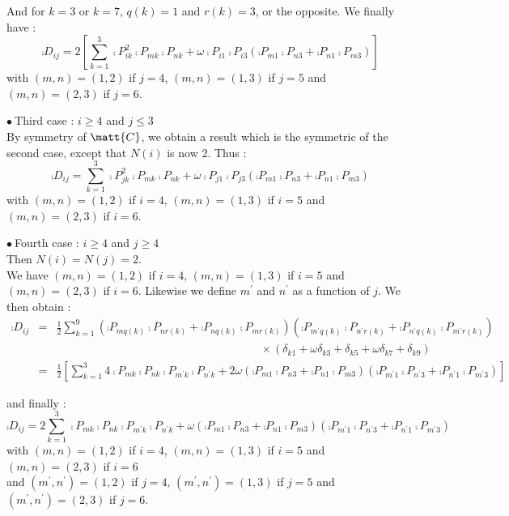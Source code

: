 And for $k=3$ or $k=7$, $q(k)=1$ and $r(k)=3$, or the opposite. We finally have :
\begin{equation}
\comp{D}_{ij}=2\left[\sum_{k=1}^3
\comp{P}_{ik}^2\comp{P}_{mk}\comp{P}_{nk}
+\omega\comp{P}_{i1}\comp{P}_{i3}\left(
\comp{P}_{m1}\comp{P}_{n3}+\comp{P}_{n1}\comp{P}_{m3}\right)
\right]
\end{equation}
with $(m,n)=(1,2)$ if $j=4$, $(m,n)=(1,3)$ if $j=5$ and $(m,n)=(2,3)$ if
$j=6$.

\vspace{1cm}
$\bullet\ ${\sc Third case} : $i\geqslant 4$ and $j\leqslant 3$\\
By symmetry of $\matt{C}$, we obtain a result which is the symmetric of
the second case, except that $N(i)$ is now 2. Thus :
\begin{equation}
\comp{D}_{ij}=\sum_{k=1}^3
\comp{P}_{jk}^2\comp{P}_{mk}\comp{P}_{nk}
+\omega\comp{P}_{j1}\comp{P}_{j3}\left(
\comp{P}_{m1}\comp{P}_{n3}+\comp{P}_{n1}\comp{P}_{m3}\right)
\end{equation}
with $(m,n)=(1,2)$ if $i=4$, $(m,n)=(1,3)$ if $i=5$ and $(m,n)=(2,3)$ if
$i=6$.

\vspace{1cm}
$\bullet\ ${\sc Fourth case} : $i\geqslant 4$ and $j\geqslant 4$\\
Then $N(i)=N(j)=2$.\\
We have $(m,n)=(1,2)$ if $i=4$, $(m,n)=(1,3)$ if $i=5$ and
$(m,n)=(2,3)$ if $i=6$. Likewise we define $m^\prime$ and
$n^\prime$ as a function of $j$. We then obtain :
\begin{eqnarray}
\comp{D}_{ij}&=&\frac{1}{2}\sum_{k=1}^9
\left(\comp{P}_{mq(k)}\comp{P}_{nr(k)}+\comp{P}_{nq(k)}\comp{P}_{mr(k)}\right)
\left(\comp{P}_{m^\prime q(k)}\comp{P}_{n^\prime r(k)}
+\comp{P}_{n^\prime q(k)}\comp{P}_{m^\prime r(k)}\right)\nonumber\\
&&\qquad\qquad\qquad\qquad\qquad\qquad\qquad\qquad\qquad\times
(\delta_{k1}+\omega\delta_{k3}+\delta_{k5}+\omega\delta_{k7}+\delta_{k9})\nonumber\\
&=&\frac{1}{2}\left[
\sum_{k=1}^3 4\comp{P}_{mk}\comp{P}_{nk}
\comp{P}_{m^\prime k}\comp{P}_{n^\prime k}
+2\omega\left(\comp{P}_{m1}\comp{P}_{n3}+\comp{P}_{n1}\comp{P}_{m3}\right)
\left(\comp{P}_{m^\prime 1}\comp{P}_{n^\prime 3}
+\comp{P}_{n^\prime 1}\comp{P}_{m^\prime 3}\right)\right]
\end{eqnarray}

and finally :
\begin{equation}
\comp{D}_{ij}=
2\sum_{k=1}^3  \comp{P}_{mk}\comp{P}_{nk}
\comp{P}_{m^\prime k}\comp{P}_{n^\prime k}
+\omega\left(\comp{P}_{m1}\comp{P}_{n3}+\comp{P}_{n1}\comp{P}_{m3}\right)
\left(\comp{P}_{m^\prime 1}\comp{P}_{n^\prime 3}
+\comp{P}_{n^\prime 1}\comp{P}_{m^\prime 3}\right)
\end{equation}
with $(m,n)=(1,2)$ if $i=4$, $(m,n)=(1,3)$ if $i=5$ and $(m,n)=(2,3)$ if
$i=6$\\
and $(m^\prime ,n^\prime )=(1,2)$ if $j=4$, $(m^\prime ,n^\prime )=(1,3)$
if $j=5$ and $(m^\prime ,n^\prime )=(2,3)$ if $j=6$.
